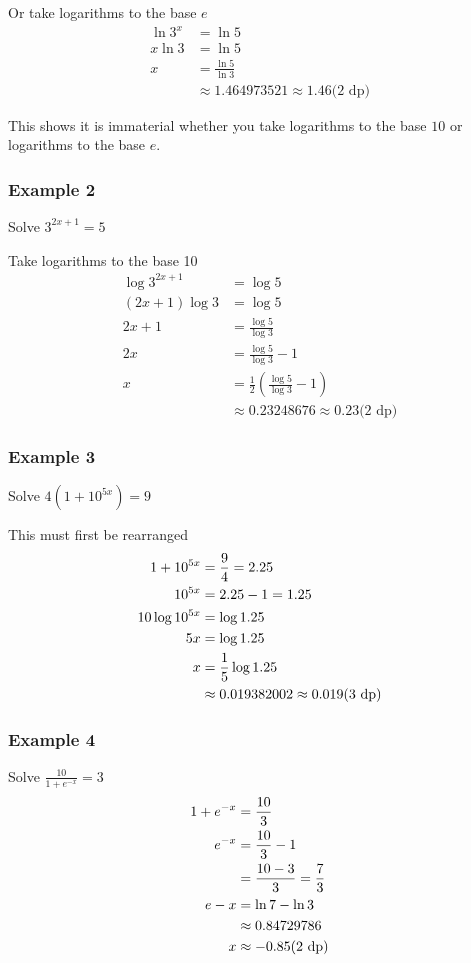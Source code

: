 Or take logarithms to the base $e$
\begin{align*}\ln  3^{x} &  = \ln  5 \\
x \ln  3 &  = \ln  5 \\
x &  = \frac{\ln  5}{\ln  3} \\
 &  \approx 1.464973521 \approx 1.46\text{(2 dp)}\end{align*}

This shows it is immaterial whether you take logarithms to the base $10$ or logarithms to the base $e$. 

\subsubsection{Example 2}
Solve $3^{2 x +1} =5$ 

Take logarithms to the base 10
\begin{align*}\log  3^{2 x +1} &  = \log  5 \\
\left (2 x +1\right ) \log  3 &  = \log  5 \\
2 x +1 &  = \frac{\log  5}{\log  3} \\
2 x &  = \frac{\log  5}{\log  3} -1 \\
x &  = \frac{1}{2} \left (\frac{\log  5}{\log  3} -1\right ) \\
 &  \approx 0.23248676 \approx 0.23\text{(2 dp)}\end{align*}

\subsubsection{Example 3}
Solve $4 \left (1 +10^{5 x}\right ) =9$ 

This must first be rearranged
\begin{align*}1 +10^{5 x} &  = \frac{9}{4} =2.25 \\
10^{5 x} &  = 2.25 -1 =1.25 \\
\text{}{\scriptsize 10}\text{}\log  10^{5 x} &  = \log  1.25 \\
5 x &  = \log  1.25 \\
x &  = \frac{1}{5} \log  1.25 \\
 &  \approx 0.019382002 \approx 0.019\text{(3 dp)}\end{align*}

\subsubsection{Example 4}
Solve $\frac{10}{1 +e^{ -x}} =3$
\begin{align*}1 +e^{ -x} &  = \frac{10}{3} \\
e^{ -x} &  = \frac{10}{3} -1 \\
 &  = \frac{10 -3}{3} =\frac{7}{3} \\
\text{}{\scriptsize e}\text{} -x &  = \ln  7 -\ln  3 \\
 &  \approx 0.84729786 \\
x &  \approx  -0.85\text{(2 dp)}\end{align*}

